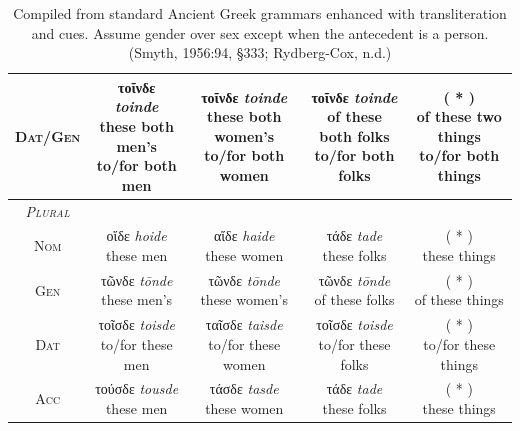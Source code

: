 \documentclass[10pt,a4paper,notitlepage]{article}
\newcommand{\tsc}[1]{\textsc{#1}}
\newcommand*{\grc}[1]{\fontspec{Inter}#1\rmfamily}
\newcommand{\trc}[1]{\textit{\fontspec{Tinos}#1}}
\begin{document}
\begin{table}[H]
\begin{tabular}{c|ccc|c}
            \tsc{Dat/Gen} & \makecell{\grc{τοῖνδε} \trc{toinde} \\ \small these both men's\\ \small to/for both men} & \makecell{\grc{τοῖνδε} \trc{toinde} \\ \small these both women's\\ \small to/for both women} & \makecell{\grc{τοῖνδε} \trc{toinde} \\ \small of these both folks\\ \small to/for both folks} & \makecell{( * ) \\ \small of these two things\\ \small to/for both things} \\
            \hline
            \emph{\tsc{Plural}} & & & & \\
            \tsc{Nom} & \makecell{\grc{οἵδε} \trc{hoide} \\ \small these men} & \makecell{\grc{αἵδε} \trc{haide} \\ \small these women} & \makecell{\grc{τάδε} \trc{tade} \\ \small these folks} & \makecell{( * ) \\ \small these things} \\
            \tsc{Gen} & \makecell{\grc{τῶνδε} \trc{tōnde} \\ \small these men's} & \makecell{\grc{τῶνδε} \trc{tōnde} \\ \small these women's} & \makecell{\grc{τῶνδε} \trc{tōnde} \\ \small of these folks} & \makecell{( * ) \\ \small of these things} \\
            \tsc{Dat} & \makecell{\grc{τοῖσδε} \trc{toisde} \\ \small to/for these men} & \makecell{\grc{ταῖσδε} \trc{taisde}\\ \small to/for these women} & \makecell{\grc{τοῖσδε} \trc{toisde} \\ \small to/for these folks} & \makecell{( * ) \\ \small to/for these things} \\
            \tsc{Acc} & \makecell{\grc{τούσδε} \trc{tousde} \\ \small these men} & \makecell{\grc{τάσδε} \trc{tasde} \\ \small these women} & \makecell{\grc{τάδε} \trc{tade} \\ \small these folks} & \makecell{( * ) \\ \small these things} \\
        \end{tabular}
        \caption{Compiled from standard Ancient Greek grammars enhanced with transliteration and cues.
            Assume gender over sex except when the antecedent is a person.
            (Smyth, 1956:94, \S333; Rydberg-Cox, n.d.)}
    \end{table}
\end{document}
